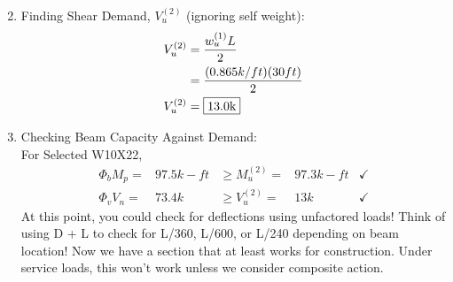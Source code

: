 \documentclass{report} %
\begin{document}
\begin{enumerate}
\begin{equation*}
        \end{equation*}
    \item Finding Shear Demand, $V^{(2)}_u$ (ignoring self weight):
        \begin{equation*}
            \begin{aligned}
                V^{(2)}_u   &= \frac{{w^{(1)}_u}L}{2} \\
                            &= \frac{(0.865k/ft)(30ft)}{2} \\
                V^{(2)}_u   &= \framebox{13.0k}
            \end{aligned}
        \end{equation*}
    \item Checking Beam Capacity Against Demand: \\
    For Selected W10X22,
        \begin{equation*}
            \begin{aligned}
                \Phi _b M_p = &97.5k-ft &\geq M^{(2)}_u = &97.3k-ft &\checkmark\\
                \Phi _v V_n = &73.4k &\geq V^{(2)}_u = &13k &\checkmark
            \end{aligned}
        \end{equation*}
    At this point, you could check for deflections using unfactored loads! Think of using D + L to check for L/360, L/600, or L/240 depending on beam location! 
    \newline
    Now we have a section that at least works for construction. Under service loads, this won't work unless we consider composite action.
\end{enumerate}
\end{document}
